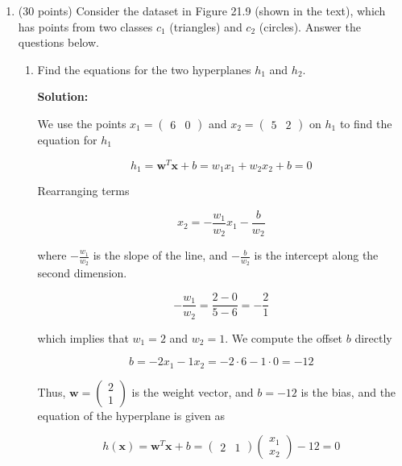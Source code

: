 \documentclass[11pt]{article}
\begin{document}
\begin{enumerate}
\begin{enumerate}
\end{enumerate}

\item (30 points) Consider the dataset in Figure 21.9 (shown in the text), which has points from two classes $c_1$ (triangles) and $c_2$ (circles). Answer the questions below.

\begin{enumerate}
\item Find the equations for the two hyperplanes $h_1$ and $h_2$.

\textbf{Solution:}

We use the points $x_1 = (\begin{array}{cc}6 & 0 \end{array})$ and $x_2 = (\begin{array}{cc}5 & 2 \end{array})$ on $h_1$ to find the equation for $h_1$

\begin{equation*}
h_1 = \mathbf{w}^\mathit{T} \mathbf{x} + b = w_1 x_1 + w_2 x_2 + b = 0
\end{equation*}

Rearranging terms

\begin{equation*}
x_2 = - \frac{w_1}{w_2} x_1 - \frac{b}{w_2}
\end{equation*}

where $- \frac{w_1}{w_2}$ is the slope of the line, and $- \frac{b}{w_2}$ is the intercept along the second dimension.

\begin{equation*}
-\frac{w_1}{w_2} = \frac{2-0}{5-6} = -\frac{2}{1}
\end{equation*}

which implies that $w_1 = 2$ and $w_2 = 1$. We compute the offset $b$ directly

\begin{equation*}
b = - 2 x_1 - 1 x_2 = -2 \cdot 6 - 1 \cdot 0 = -12
\end{equation*}

Thus, $\mathbf{w} = \left( \begin{array}{c} 2 \\ 1 \end{array} \right)$ is the weight vector, and $b = -12$ is the bias, and the equation of the hyperplane is given as

\begin{equation*}
h(\mathbf{x}) = \mathbf{w}^\mathit{T} \mathbf{x} + b = (\begin{array}{cc} 2 & 1 \end{array}) \left( \begin{array}{c} x_1 \\ x_2 \end{array} \right) - 12 = 0
\end{equation*}


\end{enumerate}
\end{enumerate}
\end{document}
